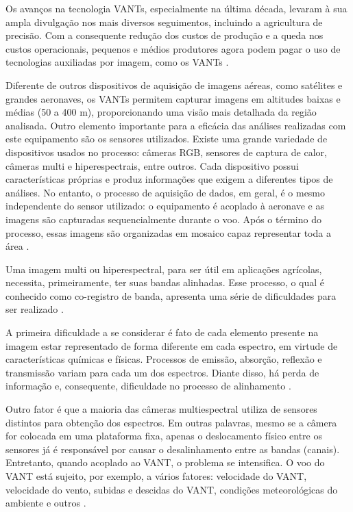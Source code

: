 \documentclass[12pt]{article}
\begin{document}
Os avanços na tecnologia VANTs, especialmente na última década, levaram à sua ampla divulgação nos mais diversos seguimentos, incluindo a agricultura de precisão. Com a consequente redução dos custos de produção e a queda nos custos operacionais, pequenos e médios produtores agora podem pagar o uso de tecnologias auxiliadas por imagem, como os VANTs \cite{jenkins2013economic}. 


Diferente de outros dispositivos de aquisição de imagens aéreas, como satélites e grandes aeronaves, os VANTs permitem capturar imagens em altitudes baixas e médias (50 a 400 m), proporcionando uma visão mais detalhada da região analisada. Outro elemento importante para a eficácia das análises realizadas com este equipamento são os sensores utilizados. Existe uma grande variedade de dispositivos usados no processo: câmeras RGB, sensores de captura de calor, câmeras multi e hiperespectrais, entre outros. Cada dispositivo possui características próprias e produz informações que exigem a diferentes tipos de análises. No entanto, o processo de aquisição de dados, em geral, é o mesmo independente do sensor utilizado: o equipamento é acoplado à aeronave e as imagens são capturadas sequencialmente durante o voo. Após o término do processo, essas imagens são organizadas em mosaico capaz representar toda a área \cite{mcbratney2005future,milella2019multi,blackmer1996aerial,sankaran2015low,kataoka2003crop}. 

Uma imagem multi ou hiperespectral, para ser útil em aplicações agrícolas, necessita, primeiramente, ter suas bandas alinhadas. Esse processo, o qual é conhecido como co-registro de banda, apresenta uma série de dificuldades para ser realizado \cite{junior2019detection}. 

A primeira dificuldade a se considerar é fato de cada elemento presente na imagem estar representado de forma diferente em cada espectro, em virtude de características químicas e físicas. Processos de emissão, absorção, reflexão e transmissão variam para cada um dos espectros. Diante disso, há perda de informação e, consequente, dificuldade no processo de alinhamento \cite{banerjee2018alignment}.

Outro fator é que a maioria das câmeras multiespectral utiliza de sensores distintos para obtenção dos espectros. Em outras palavras, mesmo se a câmera for colocada em uma plataforma fixa, apenas o deslocamento físico entre os sensores já é responsável por causar o desalinhamento entre as bandas (canais). Entretanto, quando acoplado ao VANT, o problema se intensifica. O voo do VANT está sujeito, por exemplo, a vários fatores: velocidade do VANT, velocidade do vento, subidas e descidas do VANT, condições meteorológicas do ambiente e outros \cite{junior2019detection, banerjee2018alignment}. 
\end{document}
